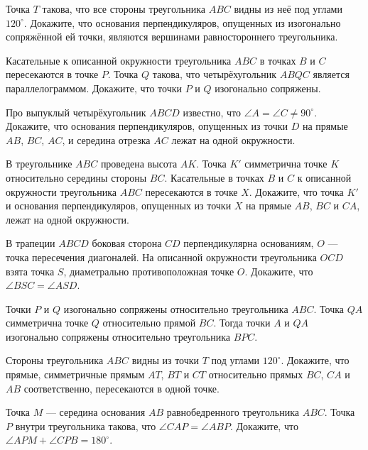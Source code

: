\documentclass{article}
\begin{document}
    \begin{enumerate_boxed}

        \item Точка $T$ такова, что все стороны треугольника $ABC$ видны из неё под углами $120^\circ$.
        Докажите, что основания перпендикуляров, опущенных из изогонально сопряжённой ей точки, являются вершинами равностороннего треугольника.

        \item Касательные к описанной окружности треугольника $ABC$ в точках $B$ и $C$ пересекаются в точке $P$.
        Точка $Q$ такова, что четырёхугольник $ABQC$ является параллелограммом.
        Докажите, что точки $P$ и $Q$ изогонально сопряжены.

        \item Про выпуклый четырёхугольник $ABCD$ известно, что $\angle A=\angle C\neq 90^\circ$.
        Докажите, что основания перпендикуляров, опущенных из точки $D$ на прямые $AB$, $BC$, $AC$, и середина отрезка $AC$ лежат на одной окружности.

        \item  В треугольнике $ABC$ проведена высота $AK$.
        Точка $K'$ симметрична точке $K$ относительно середины стороны $BC$.
        Касательные в точках $B$ и $C$ к описанной окружности треугольника $ABC$ пересекаются в точке $X$.
        Докажите, что точка $K'$ и основания перпендикуляров, опущенных из точки $X$ на прямые $AB$, $BC$ и $CA$, лежат на одной окружности.

        \item В трапеции $ABCD$ боковая сторона $CD$ перпендикулярна основаниям, $O$ — точка пересечения диагоналей.
        На описанной окружности треугольника $OCD$ взята точка $S$, диаметрально противоположная точке $O$.
        Докажите, что $\angle BSC=\angle ASD$.

        \item Точки $P$ и $Q$ изогонально сопряжены относительно треугольника $ABC$.
        Точка $QA$ симметрична точке $Q$ относительно прямой $BC$.
        Тогда точки $A$ и $QA$ изогонально сопряжены относительно треугольника $BPC$.

        \item Стороны треугольника $ABC$ видны из точки $T$ под углами $120^\circ$.
        Докажите, что прямые, симметричные прямым $AT$, $BT$ и $CT$ относительно прямых $BC$, $CA$ и $AB$ соответственно, пересекаются в одной точке.

        \item Точка $M$ — середина основания $AB$ равнобедренного треугольника $ABC$.
        Точка $P$ внутри треугольника такова, что $\angle CAP=\angle ABP$.
        Докажите, что $\angle APM+\angle CPB=180^\circ$.


\end{enumerate_boxed}
\end{document}
